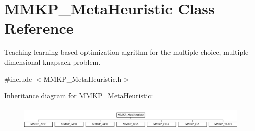 \hypertarget{class_m_m_k_p___meta_heuristic}{\section{M\+M\+K\+P\+\_\+\+Meta\+Heuristic Class Reference}
\label{class_m_m_k_p___meta_heuristic}
}


Teaching-\/learning-\/based optimization algrithm for the multiple-\/choice, multiple-\/dimensional knapsack problem.  




{\ttfamily \#include $<$M\+M\+K\+P\+\_\+\+Meta\+Heuristic.\+h$>$}

Inheritance diagram for M\+M\+K\+P\+\_\+\+Meta\+Heuristic\+:\begin{figure}[H]
\begin{center}
\leavevmode
\includegraphics[height=1.118881cm]{class_m_m_k_p___meta_heuristic}
\end{center}
\end{figure}
